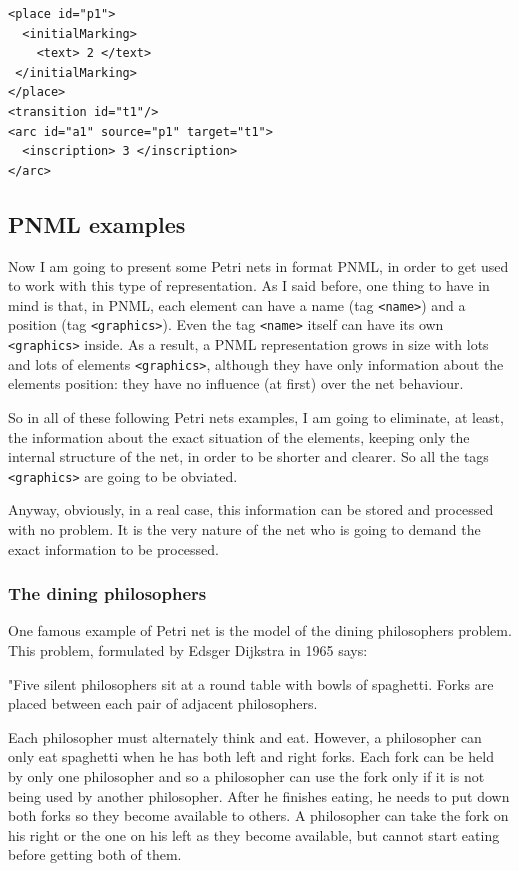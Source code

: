 \begin{lstlisting}[label=pmnl_simplified_representation,caption=Simplified PNML representation
for a basic Petri net]
<place id="p1">
  <initialMarking>
    <text> 2 </text>
 </initialMarking>
</place>
<transition id="t1"/>
<arc id="a1" source="p1" target="t1">
  <inscription> 3 </inscription>
</arc>
\end{lstlisting}








\subsection{PNML examples}

Now I am going to present some Petri nets in format PNML, in order to get
used to work with this type of representation. As I said before, one thing to have in mind
is that, in PNML, each element can have a name (tag \texttt{<name>}) and a position
(tag \texttt{<graphics>}).  Even the
tag \texttt{<name>} itself can have its own \texttt{<graphics>} inside. As
a result, a PNML representation grows in size with lots and lots of elements
\texttt{<graphics>}, although they have only information about the elements
position: they have no influence (at first) over the net behaviour.

So in all of these following Petri nets examples,
I am going to eliminate, at least, the information about the exact situation of the elements, keeping only the internal structure of the net,
in order to be shorter and clearer. So all the tags \texttt{<graphics>} are going to
be obviated.

Anyway, obviously, in a real case, this information can be stored and processed
with no problem. It is the very nature of the net who is going to demand the exact information to be processed. 

\subsubsection{The dining philosophers}

One famous example of Petri net is the model of the dining philosophers
problem.
This problem, formulated by Edsger Dijkstra in 1965 says:

"Five silent philosophers sit at a round table with bowls of spaghetti. Forks are placed between each pair of adjacent philosophers.

Each philosopher must alternately think and eat. However, a philosopher can only eat spaghetti when he has both left and right forks. Each fork can be held by only one philosopher and so a philosopher can use the fork only if it is not being used by another philosopher. After he finishes eating, he needs to put down both forks so they become available to others. A philosopher can take the fork on his right or the one on his left as they become available, but cannot start eating before getting both of them.

